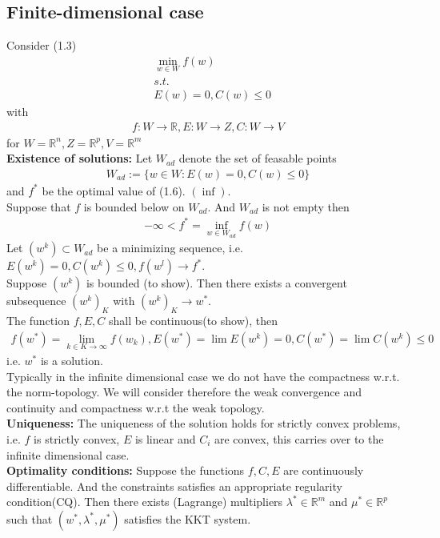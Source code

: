 \subsection{Finite-dimensional case}
Consider (1.3)
\begin{align*}
	& \min_{w \in W} f(w)\\
	& s.t.\\
	& E(w) = 0, C(w) \le 0
\end{align*}
with 
\begin{align}
	f: W \rightarrow \mathbb{R}, E: W \rightarrow Z, C: W \rightarrow V
\end{align}
for $W = \mathbb{R}^n, Z = \mathbb{R}^p, V = \mathbb{R}^m$\\
\textbf{Existence of solutions:}
Let $W_{ad}$ denote the set of feasable points 
\begin{align*}
	W_{ad}:= \{ w \in W: E(w) = 0, C(w) \le 0\}
\end{align*}
and $f^*$ be the optimal value of (1.6). $(\inf)$. \\
Suppose that $f$ is bounded below on $W_{ad}$. And $W_{ad}$ is not empty then
\begin{align*}
	- \infty < f^* = \inf_{w \in W_{ad}} f(w)
\end{align*}
Let $(w^k) \subset W_{ad}$ be a minimizing sequence, i.e. $E(w^k) = 0, C(w^k) \le 0, f(w^l) \rightarrow f^*$. \\
Suppose $(w^k)$ is bounded (to show). Then there exists a convergent subsequence $(w^k)_K$ with $(w^k)_K \rightarrow w^*$. \\
The function $f, E, C$ shall be continuous(to show), then 
\begin{align*}
	f(w^*) = \lim_{k \in K \rightarrow \infty} f(w_k), 
	E(w^*) = \lim E(w^k) = 0, 
	C(w^*) = \lim C(w^k) \le 0
\end{align*}
i.e. $w^*$ is a solution. \\
Typically in the infinite dimensional case we do not have the compactness w.r.t. the norm-topology. We will consider therefore the weak convergence and continuity and compactness w.r.t the weak topology. \\
\textbf{Uniqueness:} The uniqueness of the solution holds for strictly convex problems, i.e. $f$ is strictly convex, $E$ is linear and $C_i$ are convex, this carries over to the infinite dimensional case. \\
\textbf{Optimality conditions: }
Suppose the functions $f, C, E$ are continuously differentiable. And the constraints satisfies an appropriate regularity condition(CQ). Then there exists (Lagrange) multipliers $\lambda^*\in \mathbb{R}^m$ and $\mu^* \in \mathbb{R}^p$ such that $(w^*, \lambda^*, \mu^*)$ satisfies the KKT system. 
